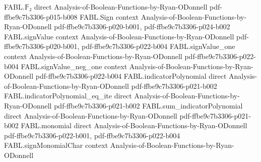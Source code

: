 \begin{theorem}
\label{FABL.goldreichLevinQueryRunUpTo_satisfiesInvariant_of_mem_support}
\leanok
{}
\proofstep
  {FABL.𝔽₂}
  {direct}
  {Analysis-of-Boolean-Functions-by-Ryan-ODonnell}
  {pdf-ffbe9c7b3306-p015-b008}
\proofstep
  {FABL.Sign}
  {context}
  {Analysis-of-Boolean-Functions-by-Ryan-ODonnell}
  {pdf-ffbe9c7b3306-p020-b001,
    pdf-ffbe9c7b3306-p024-b002}
\proofstep
  {FABL.signValue}
  {context}
  {Analysis-of-Boolean-Functions-by-Ryan-ODonnell}
  {pdf-ffbe9c7b3306-p020-b001,
    pdf-ffbe9c7b3306-p022-b004}
\proofstep
  {FABL.signValue_one}
  {context}
  {Analysis-of-Boolean-Functions-by-Ryan-ODonnell}
  {pdf-ffbe9c7b3306-p022-b004}
\proofstep
  {FABL.signValue_neg_one}
  {context}
  {Analysis-of-Boolean-Functions-by-Ryan-ODonnell}
  {pdf-ffbe9c7b3306-p022-b004}
\proofstep
  {FABL.indicatorPolynomial}
  {direct}
  {Analysis-of-Boolean-Functions-by-Ryan-ODonnell}
  {pdf-ffbe9c7b3306-p021-b002}
\proofstep
  {FABL.indicatorPolynomial_eq_ite}
  {direct}
  {Analysis-of-Boolean-Functions-by-Ryan-ODonnell}
  {pdf-ffbe9c7b3306-p021-b002}
\proofstep
  {FABL.sum_indicatorPolynomial}
  {direct}
  {Analysis-of-Boolean-Functions-by-Ryan-ODonnell}
  {pdf-ffbe9c7b3306-p021-b002}
\proofstep
  {FABL.monomial}
  {direct}
  {Analysis-of-Boolean-Functions-by-Ryan-ODonnell}
  {pdf-ffbe9c7b3306-p022-b001,
    pdf-ffbe9c7b3306-p022-b004}
\proofstep
  {FABL.signMonomialChar}
  {context}
  {Analysis-of-Boolean-Functions-by-Ryan-ODonnell}

\end{theorem}
